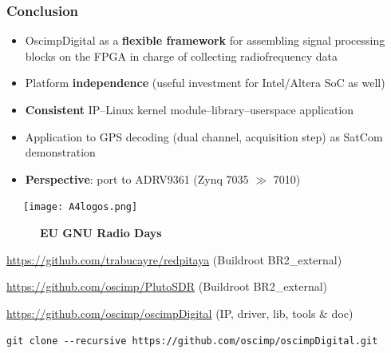 \documentclass[compress,10pt]{beamer}
\begin{document}
\begin{frame}[fragile]\frametitle{Conclusion}

\begin{minipage}[t]{\linewidth}
\begin{minipage}{.65\linewidth}
{\footnotesize
\begin{itemize}
\item OscimpDigital as a {\bf flexible framework} 
for assembling signal processing
blocks on the FPGA in charge of collecting radiofrequency data
\item Platform {\bf independence} (useful investment for Intel/Altera SoC as well)
\item {\bf Consistent} IP--Linux kernel module--library--userspace application
\item Application to GPS decoding (dual channel, acquisition step) as SatCom
demonstration
\item {\bf Perspective}: port to ADRV9361 (Zynq 7035 $\gg$ 7010)
\end{itemize}
}
\vfill
{}
\end{minipage}
\begin{minipage}{.34\linewidth}
~~~\texttt{[image: A4logos.png]}

~~~~~~{\bf\footnotesize EU GNU Radio Days}
\end{minipage}
\end{minipage}

\vspace{0.1cm}

{\footnotesize
{\url{https://github.com/trabucayre/redpitaya}} (Buildroot BR2\_external)

{\url{https://github.com/oscimp/PlutoSDR}} (Buildroot BR2\_external)

{\url{https://github.com/oscimp/oscimpDigital}} (IP, driver, lib, tools \& doc)
}

\vfill
{}

{\footnotesize
{\verb!git clone --recursive https://github.com/oscimp/oscimpDigital.git!}
}
\end{frame}
\end{document}
